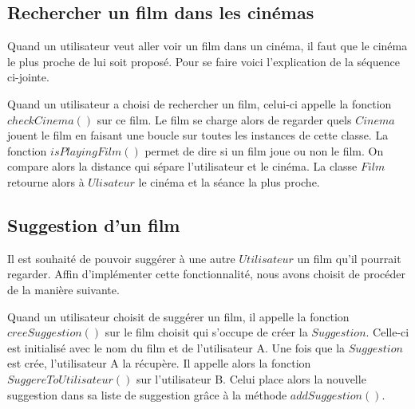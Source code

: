 \documentclass[10pt,a4paper]{article}
\begin{document}
    

    \subsection{Rechercher un film dans les cinémas}

    Quand un utilisateur veut aller voir un film dans un cinéma, il faut que le cinéma le plus proche de lui soit proposé. Pour se faire voici l'explication de la séquence ci-jointe.

    

    Quand un utilisateur a choisi de rechercher un film, celui-ci appelle la fonction $checkCinema()$ sur ce film. Le film se charge alors de regarder quels $Cinema$ jouent le film en faisant une boucle sur toutes les instances de cette classe. La fonction $isPlayingFilm()$ permet de dire si un film joue ou non le film. On compare alors la distance qui sépare l'utilisateur et le cinéma. La classe $Film$ retourne alors à $Ulisateur$ le cinéma et la séance la plus proche.

    

    \subsection{Suggestion d'un film}

    

    Il est souhaité de pouvoir suggérer à une autre $Utilisateur$ un film qu'il pourrait regarder. Affin d'implémenter cette fonctionnalité, nous avons choisit de procéder de la manière suivante.

    

    Quand un utilisateur choisit de suggérer un film, il appelle la fonction $creeSuggestion()$ sur le film choisit qui s'occupe de créer la $Suggestion$. Celle-ci est initialisé avec le nom du film et de l'utilisateur A. Une fois que la $Suggestion$ est crée, l'utilisateur A la récupère. Il appelle alors la fonction $SuggereToUtilisateur()$ sur l'utilisateur B. Celui place alors la nouvelle suggestion dans sa liste de suggestion grâce à la méthode $addSuggestion()$.

    
\end{document}
